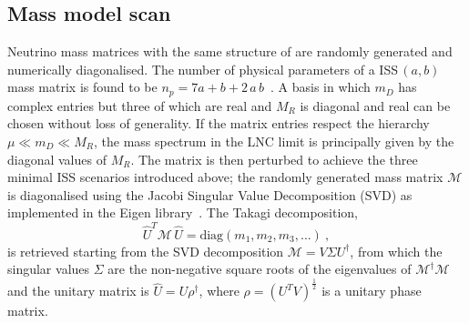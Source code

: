 \subsection{Mass model scan}

Neutrino mass matrices with the same structure of  are randomly generated and numerically diagonalised.
The number of physical parameters of a ISS\,$(a,b)$ mass matrix is found to be $n_p = 7a + b +2\, a\,b$~\cite{Abada:2014vea}. %
A basis in which $m_D$ has complex entries but three of which are real %
and $M_R$ is diagonal and real can be chosen without loss of generality.
If the matrix entries respect the hierarchy \mbox{$\mu \ll m_D \ll M_R$}, the mass spectrum in %
the LNC limit is principally given by the diagonal values of $M_R$.
The matrix is then perturbed to achieve the three minimal ISS scenarios introduced above; %
the randomly generated mass matrix $\mathcal{M}$ %
is diagonalised using the Jacobi Singular Value Decomposition (SVD) as implemented in the Eigen library~\cite{eigenweb}.
The Takagi decomposition, %
\begin{equation}
	\hat{U}^T \mathcal{M}\, \hat{U} = \text{diag}(m_1, m_2, m_3, ...)\ ,
\end{equation}
is retrieved starting from the SVD decomposition $\mathcal{M} = V \Sigma U^\dagger$, %
from which the singular values $\Sigma$ are the non-negative square roots of the eigenvalues of $\mathcal{M}^\dagger \mathcal{M}$ %
and the unitary matrix is $\hat{U} = U \rho^\dagger$, where $\rho = (U^T V)^\frac{1}{2}$ is a unitary phase matrix.


